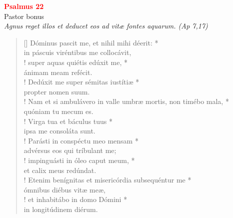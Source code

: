 


\def\greinitialformat#1{%
{\fontsize{39}{39}\selectfont #1}%
}




\vspace{0.3cm}
\begin{center}
 \textcolor{red}{\large \bf Psalmus 22}\\
Pastor bonus\\
\textit{\small Agnus reget illos et deducet eos ad vitæ fontes aquarum. (Ap 7,17)}
\end{center}
\begin{verse}[\versewidth]
Dóminus pascit me, et nihil mihi déerit: *\\
in páscuis viréntibus me collocávit,\\!
\vin super aquas quiétis edúxit me, *\\
\vin ánimam meam refécit.\\!
Dedúxit me super sémitas iustítiæ *\\
propter nomen suum.\\!
\vin Nam et si ambulávero in valle umbræ mortis, non timébo mala, *\\
\vin quóniam tu mecum es.\\!
Virga tua et báculus tuus *\\
ipsa me consoláta sunt.\\!
\vin Parásti in conspéctu meo mensam *\\
\vin advérsus eos qui tríbulant me;\\!
impinguásti in óleo caput meum, *\\
et calix meus redúndat.\\!
\vin Etenim benígnitas et misericórdia subsequéntur me *\\
\vin ómnibus diébus vitæ meæ,\\!
et inhabitábo in domo Dómini *\\
in longitúdinem diérum.\\
\end{verse}
\vspace{1cm}


